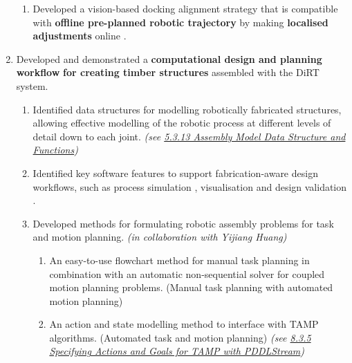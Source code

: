 \begin{enumerate}
\begin{enumerate}
		\item Developed a vision-based docking alignment strategy that is compatible with \textbf{offline pre-planned robotic trajectory} by making \textbf{localised adjustments} online .

	\end{enumerate}

	\item Developed and demonstrated a \textbf{computational design and planning workflow} \textbf{for creating timber structures} assembled with the DiRT system.
	\begin{enumerate}
		\item Identified data structures for modelling robotically fabricated structures, allowing effective modelling of the robotic process at different levels of detail down to each joint. \textit{(see \ul{5.3.13 Assembly Model Data Structure and Functions})}

		\item Identified key software features to support fabrication-aware design workflows, such as process simulation , visualisation  and design validation .

		\item Developed methods for formulating robotic assembly problems for task and motion planning. \textit{(in collaboration with Yijiang Huang)} 

		\begin{enumerate}
			\item An easy-to-use flowchart method for manual task planning  in combination with an automatic non-sequential solver  for coupled motion planning problems. (Manual task planning with automated motion planning)

			\item An action and state modelling method to interface with TAMP algorithms. (Automated task and motion planning) \textit{(see \ul{8.3.5 Specifying Actions and Goals for TAMP with PDDLStream})}

		\end{enumerate}
	\end{enumerate}


\end{enumerate}
